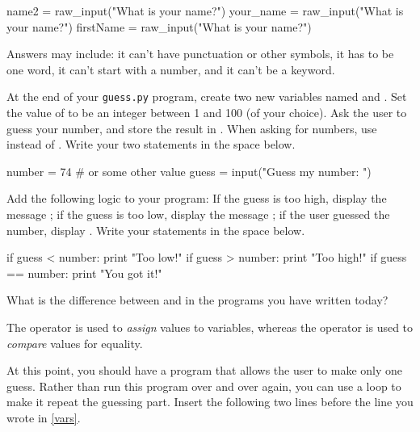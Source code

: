 \begin{pythlst}
    name2 = raw_input("What is your name?")
    your_name = raw_input("What is your name?")
    firstName = raw_input("What is your name?")
\end{pythlst}

\begin{answer}
Answers may include: it can't have punctuation or other symbols, it has to be one word, it can't start with a number, and it can't be a keyword.
\end{answer}


\Q \label{vars} At the end of your \texttt{guess.py} program, create two new variables named  and .
Set the value of  to be an integer between 1 and 100 (of your choice).
Ask the user to guess your number, and store the result in .
When asking for numbers, use  instead of .
Write your two statements in the space below.

\begin{answer}
\begin{pythans}
number = 74  # or some other value
guess = input("Guess my number: ")
\end{pythans}
\end{answer}


\Q Add the following logic to your program:
If the guess is too high, display the message ;
if the guess is too low, display the message ;
if the user guessed the number, display .
Write your statements in the space below.

\begin{answer}[9em]
\begin{pythans}
    if guess < number:
        print "Too low!"
    if guess > number:
        print "Too high!"
    if guess == number:
        print "You got it!"
\end{pythans}
\end{answer}


\Q What is the difference between \pyth{=} and \pyth{==} in the programs you have written today?

\begin{answer}
The \pyth{=} operator is used to \emph{assign} values to variables, whereas the \pyth{==} operator is used to \emph{compare} values for equality.
\end{answer}


\Q At this point, you should have a program that allows the user to make only one guess.
Rather than run this program over and over again, you can use a  loop to make it repeat the guessing part.
Insert the following two lines before the  line you wrote in \ref{vars}.

